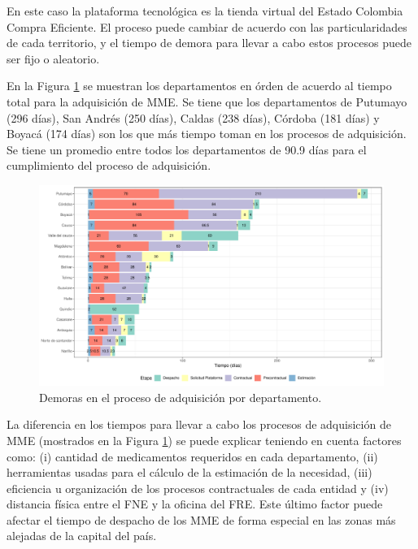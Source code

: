 \documentclass[
]{book}
\begin{document}
En este caso la plataforma tecnológica es la tienda virtual del Estado Colombia Compra Eficiente. El proceso puede cambiar de acuerdo con las particularidades de cada territorio, y el tiempo de demora para llevar a cabo estos procesos puede ser fijo o aleatorio.

En la Figura \ref{fig:EtapasProcesoAdquisicion} se muestran los departamentos en órden de acuerdo al tiempo total para la adquisición de MME. Se tiene que los departamentos de Putumayo (296 días), San Andrés (250 días), Caldas (238 días), Córdoba (181 días) y Boyacá (174 días) son los que más tiempo toman en los procesos de adquisición. Se tiene un promedio entre todos los departamentos de 90.9 días para el cumplimiento del proceso de adquisición.

\begin{figure}[t]

{\centering \includegraphics[width=1\linewidth]{InformeFinal_files/figure-latex/EtapasProcesoAdquisicion-1} 

}

\caption{Demoras en el proceso de adquisición por departamento.}\label{fig:EtapasProcesoAdquisicion}
\end{figure}

La diferencia en los tiempos para llevar a cabo los procesos de adquisición de MME (mostrados en la Figura \ref{fig:EtapasProcesoAdquisicion}) se puede explicar teniendo en cuenta factores como: (i) cantidad de medicamentos requeridos en cada departamento, (ii) herramientas usadas para el cálculo de la estimación de la necesidad, (iii) eficiencia u organización de los procesos contractuales de cada entidad y (iv) distancia física entre el FNE y la oficina del FRE. Este último factor puede afectar el tiempo de despacho de los MME de forma especial en las zonas más alejadas de la capital del país.
\end{document}
